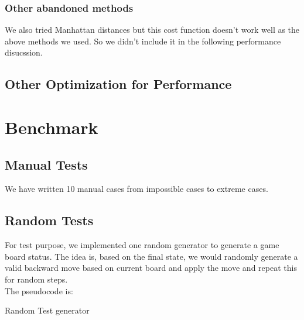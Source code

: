 \documentclass[11pt,letter]{article}
\begin{document}
\subsubsection {Other abandoned methods}
We also tried Manhattan distances but this cost function doesn't work well as the above methods we used. So we didn't include it in the following performance disucssion.

\subsection {Other Optimization for Performance}

\section {Benchmark}
\subsection {Manual Tests}
We have written 10 manual cases from impossible cases to extreme cases.
\subsection {Random Tests}
For test purpose, we implemented one random generator to generate a game board status. The idea is, based on the final state, we would randomly generate a valid backward move based on current board and apply the move and repeat this for random steps. \\
The pseudocode is:
\begin{algorithm}                      %
\caption{Random Test generator}          %
\label{random_alg}                           %
\begin{algorithmic} [1]                   %
    \EndFor
    \State {} 
    
\end{algorithmic}
\end{algorithm}
\end{document}
